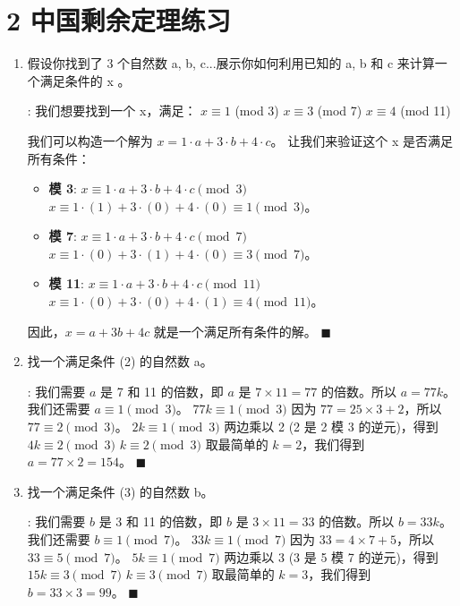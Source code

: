 \documentclass[11pt]{article}
\newenvironment{qparts}{\begin{enumerate}[{(}a{)}]}{\end{enumerate}}
\def\endproofmark{$\blacksquare$}
\newenvironment{proof}{\par\noindent{\bf 解答}:}{\endproofmark\smallskip}
\begin{document}
\newpage

\section*{2 中国剩余定理练习}

\begin{qparts}
\item 假设你找到了 3 个自然数 a, b, c...展示你如何利用已知的 a, b 和 c 来计算一个满足条件的 x 。
\begin{proof}
我们想要找到一个 x，满足：
$x\equiv1$ (mod 3)
$x\equiv3$ (mod 7)
$x\equiv4$ (mod 11)

我们可以构造一个解为 $x = 1 \cdot a + 3 \cdot b + 4 \cdot c$。
让我们来验证这个 x 是否满足所有条件：
\begin{itemize}
    \item \textbf{模 3}:
    $x \equiv 1 \cdot a + 3 \cdot b + 4 \cdot c \pmod{3}$
    $x \equiv 1 \cdot (1) + 3 \cdot (0) + 4 \cdot (0) \equiv 1 \pmod{3}$。
    \item \textbf{模 7}:
    $x \equiv 1 \cdot a + 3 \cdot b + 4 \cdot c \pmod{7}$
    $x \equiv 1 \cdot (0) + 3 \cdot (1) + 4 \cdot (0) \equiv 3 \pmod{7}$。
    \item \textbf{模 11}:
    $x \equiv 1 \cdot a + 3 \cdot b + 4 \cdot c \pmod{11}$
    $x \equiv 1 \cdot (0) + 3 \cdot (0) + 4 \cdot (1) \equiv 4 \pmod{11}$。
\end{itemize}
因此，$x = a + 3b + 4c$ 就是一个满足所有条件的解。
\end{proof}

\item 找一个满足条件 (2) 的自然数 a。
\begin{proof}
我们需要 $a$ 是 7 和 11 的倍数，即 $a$ 是 $7 \times 11 = 77$ 的倍数。所以 $a = 77k$。
我们还需要 $a \equiv 1 \pmod{3}$。
$77k \equiv 1 \pmod{3}$
因为 $77 = 25 \times 3 + 2$，所以 $77 \equiv 2 \pmod{3}$。
$2k \equiv 1 \pmod{3}$
两边乘以 2 (2 是 2 模 3 的逆元)，得到
$4k \equiv 2 \pmod{3}$
$k \equiv 2 \pmod{3}$
取最简单的 $k=2$，我们得到 $a = 77 \times 2 = 154$。
\end{proof}

\item 找一个满足条件 (3) 的自然数 b。
\begin{proof}
我们需要 $b$ 是 3 和 11 的倍数，即 $b$ 是 $3 \times 11 = 33$ 的倍数。所以 $b = 33k$。
我们还需要 $b \equiv 1 \pmod{7}$。
$33k \equiv 1 \pmod{7}$
因为 $33 = 4 \times 7 + 5$，所以 $33 \equiv 5 \pmod{7}$。
$5k \equiv 1 \pmod{7}$
两边乘以 3 (3 是 5 模 7 的逆元)，得到
$15k \equiv 3 \pmod{7}$
$k \equiv 3 \pmod{7}$
取最简单的 $k=3$，我们得到 $b = 33 \times 3 = 99$。
\end{proof}


\end{qparts}
\end{document}
